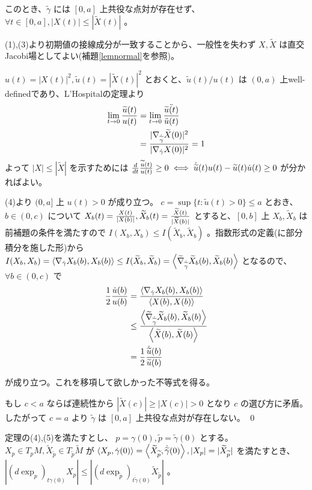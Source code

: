 \documentclass[dvipdfmx,a4paper]{jsreport}
\theoremstyle{definition}
\renewcommand{\tilde}{\widetilde}
\begin{document}
このとき、$\tilde{\gamma}$ には $[0,a]$ 上共役な点対が存在せず、$\forall t\in [0,a],|X(t)|\leq |\tilde{X}(t)|$ 。

\prf (1),(3)より初期値の接線成分が一致することから、一般性を失わず $X,\tilde{X}$ は直交Jacobi場としてよい(補題\ref{lemnormal}を参照)。

$u(t)=|X(t)|^2,\tilde{u}(t)=|\tilde{X}(t)|^2$ とおくと、$\tilde{u}(t)/u(t)$ は $(0,a)$ 上well-definedであり、L'Hospitalの定理より
\begin{align*}
    \lim_{t \to 0}{{\tilde{u}(t)} \over {u}(t)} &= \lim_{t \to 0} {\ddot{\tilde{u}(t)} \over \ddot{u}(t)} \\
    &= {|\nabla_{\dot{\tilde{\gamma}}}\tilde{X}(0)|^2 \over |\nabla_{\dot{\gamma}}X(0)|^2}=1
\end{align*}
よって $|X| \leq |\tilde{X}|$ を示すためには ${d \over dt}{\tilde{u}(t) \over u(t)} \geq 0 \iff \dot{\tilde{u}}(t)u(t)-\tilde{u}(t)\dot{u}(t) \geq 0$ が分かればよい。

(4)より $(0,a]$ 上 $u(t)>0$ が成り立つ。 $c=\sup\{t \colon \tilde{u}(t)>0\} \leq a$ とおき、 $b \in (0,c)$ について $X_b(t)={X(t) \over |X(b)|},\tilde{X}_b(t)={\tilde{X}(t) \over |\tilde{X}(b)|}$ とすると、$[0,b]$ 上 $X_b,\tilde{X}_b$ は前補題の条件を満たすので $I(X_b,X_b) \leq I(\tilde{X}_b,\tilde{X}_b)$ 。指数形式の定義(に部分積分を施した形)から $I(X_b,X_b)=\ev{\nabla_{\dot{\gamma}}X_b(b),X_b(b)} \leq I(\tilde{X}_b,\tilde{X}_b)=\ev{\tilde{\nabla}_{\dot{\tilde{\gamma}}}\tilde{X}_b(b),\tilde{X}_b(b)}$ となるので、$\forall b \in (0,c)$ で
\begin{align*}
    {1 \over 2}{\dot{u}(b)\over u(b)} &= {\ev{\nabla_{\dot{\gamma}}X_b(b),X_b(b)} \over \ev{X(b),X(b)}} \\
    &\leq {\ev{\tilde{\nabla}_{\dot{\tilde{\gamma}}}\tilde{X}_b(b),\tilde{X}_b(b)} \over \ev{\tilde{X}(b),\tilde{X}(b)}} \\
    &= {1 \over 2}{\dot{\tilde{u}}(b)\over \tilde{u}(b)}
\end{align*}

が成り立つ。これを移項して欲しかった不等式を得る。

もし $c<a$ ならば連続性から $|\tilde{X}(c)| \geq |X(c)|>0$ となり $c$ の選び方に矛盾。したがって $c=a$ より $\tilde{\gamma}$ は $[0,a]$ 上共役な点対が存在しない。 \qed

\cor 定理の(4),(5)を満たすとし、 $p=\gamma(0),\tilde{p}=\tilde{\gamma}(0)$ とする。 $X_p \in T_pM,\tilde{X}_{\tilde{p}} \in T_{\tilde{p}}\tilde{M}$ が $\ev{X_p,\dot{\gamma}(0)}=\ev{\tilde{X}_{\tilde{p}},\dot{\tilde{\gamma}}(0)},|X_p|=|\tilde{X}_{\tilde{p}}|$ を満たすとき、 $|(d\exp_{p})_{t\dot{\gamma}(0)}X_p| \leq |(d\exp_{\tilde{p}})_{t\dot{\tilde{\gamma}}(0)}\tilde{X}_{\tilde{p}}|$ 。
\end{document}
